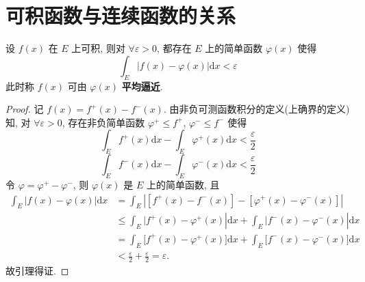 \documentclass[../../main.tex]{subfiles}
\begin{document}
\section{可积函数与连续函数的关系}

\begin{lemma}\label{lemma:引理4.3}
设 \( f(x) \) 在 \( E \) 上可积, 则对 \( \forall \varepsilon > 0 \), 都存在 \( E \) 上的简单函数 \( \varphi(x) \) 使得
\[
\int_E |f(x) - \varphi(x)|\mathrm{d}x < \varepsilon
\]
此时称 \( f(x) \) 可由 \( \varphi(x) \) \textbf{平均逼近}.
\end{lemma}
\begin{proof}
记 \( f(x) = f^+(x) - f^-(x) \). 由非负可测函数积分的定义(上确界的定义)知, 对 \( \forall \varepsilon > 0 \), 存在非负简单函数 \( \varphi^+ \leqslant f^+ \), \( \varphi^- \leqslant f^- \) 使得
\[
\int_E f^+(x)\mathrm{d}x - \int_E \varphi^+(x)\mathrm{d}x < \frac{\varepsilon}{2}
\]
\[
\int_E f^-(x)\mathrm{d}x - \int_E \varphi^-(x)\mathrm{d}x < \frac{\varepsilon}{2}
\]
令 \( \varphi = \varphi^+ - \varphi^- \), 则 \( \varphi(x) \) 是 \( E \) 上的简单函数, 且
\begin{align*}
\int_E{|f(x)}-\varphi (x)|\mathrm{d}x &=\int_E{\left| \left[ f^+\left( x \right) -f^-\left( x \right) \right] -\left[ \varphi ^+\left( x \right) -\varphi ^-\left( x \right) \right] \right|}
\\
&\leqslant \int_E{|f^+(x)}-\varphi ^+(x)|\mathrm{d}x +\int_E{|f^-(x)}-\varphi ^-(x)|\mathrm{d}x 
\\
&=\int_E{[f^+(x)}-\varphi ^+(x)]\mathrm{d}x +\int_E{[f^-(x)}-\varphi ^-(x)]\mathrm{d}x 
\\
&<\frac{\varepsilon}{2}+\frac{\varepsilon}{2}=\varepsilon .
\end{align*}
故引理得证.

\end{proof}
\end{document}
